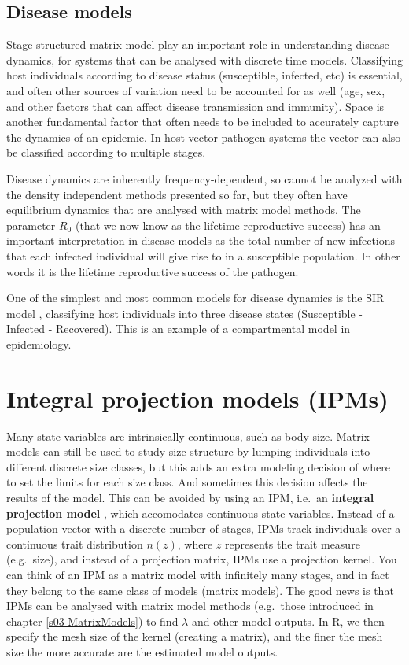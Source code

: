 \documentclass[
]{book}
\begin{document}
\hypertarget{disease-models}{%
\subsection{Disease models}\label{disease-models}}

Stage structured matrix model play an important role in understanding disease dynamics, for systems that can be analysed with discrete time models. Classifying host individuals according to disease status (susceptible, infected, etc) is essential, and often other sources of variation need to be accounted for as well (age, sex, and other factors that can affect disease transmission and immunity). Space is another fundamental factor that often needs to be included to accurately capture the dynamics of an epidemic. In host-vector-pathogen systems the vector can also be classified according to multiple stages.

Disease dynamics are inherently frequency-dependent, so cannot be analyzed with the density independent methods presented so far, but they often have equilibrium dynamics that are analysed with matrix model methods. The parameter \(R_0\) (that we now know as the lifetime reproductive success) has an important interpretation in disease models as the total number of new infections that each infected individual will give rise to in a susceptible population. In other words it is the lifetime reproductive success of the pathogen.

One of the simplest and most common models for disease dynamics is the SIR model \citep{Kermack1}, classifying host individuals into three disease states (Susceptible - Infected - Recovered). This is an example of a compartmental model in epidemiology.

\hypertarget{integral-projection-models-ipms}{%
\section{Integral projection models (IPMs)}\label{integral-projection-models-ipms}}

Many state variables are intrinsically continuous, such as body size. Matrix models can still be used to study size structure by lumping individuals into different discrete size classes, but this adds an extra modeling decision of where to set the limits for each size class. And sometimes this decision affects the results of the model. This can be avoided by using an IPM, i.e.~an \textbf{integral projection model} \citep{Easterling1}, which accomodates continuous state variables. Instead of a population vector with a discrete number of stages, IPMs track individuals over a continuous trait distribution \(n(z)\), where \(z\) represents the trait measure (e.g.~size), and instead of a projection matrix, IPMs use a projection kernel. You can think of an IPM as a matrix model with infinitely many stages, and in fact they belong to the same class of models (matrix models). The good news is that IPMs can be analysed with matrix model methods (e.g.~those introduced in chapter \ref{s03-MatrixModels}) to find \(\lambda\) and other model outputs. In R, we then specify the mesh size of the kernel (creating a matrix), and the finer the mesh size the more accurate are the estimated model outputs.
\end{document}
